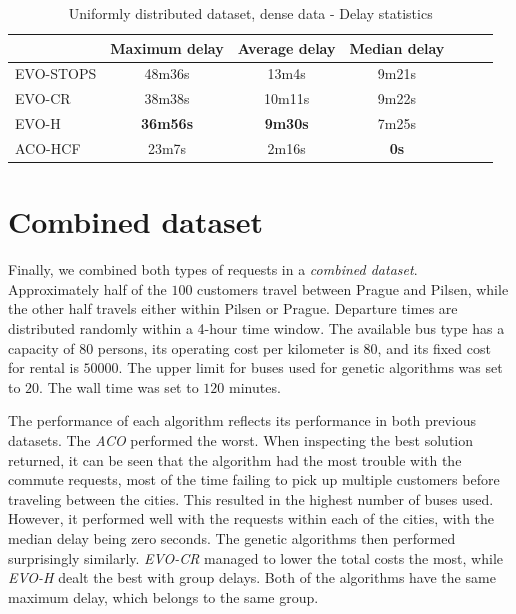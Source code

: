\begin{table}
    \centering
    \begin{tabular}{lcccccc}
         &  Maximum delay & Average delay & Median delay \\
         \hline
         EVO-STOPS & 48m36s & 13m4s & 9m21s \\
         EVO-CR & 38m38s & 10m11s & 9m22s \\
         EVO-H & \textbf{36m56s} & \textbf{9m30s} & 7m25s \\
         ACO-HCF & 23m7s & 2m16s & \textbf{0s} \\
    \end{tabular}
    \caption{Uniformly distributed dataset, dense data - Delay statistics}
    \label{tab:exp_random_dense_delay_stats}
\end{table}

\clearpage

\section{Combined dataset}

Finally, we combined both types of requests in a \textit{combined dataset}. Approximately half of the
$100$ customers travel between Prague and Pilsen, while the other half travels either within Pilsen or Prague. Departure times are distributed randomly within a 4-hour time window. The available bus type has a capacity of $80$ persons, its operating cost per kilometer is $80$, and its fixed cost for rental is $50000$. The upper limit for buses used for genetic algorithms was set to $20$. The wall time was set to $120$ minutes.

The performance of each algorithm reflects its performance in both previous datasets. The \textit{ACO} performed the worst. When inspecting the best solution returned, it can be seen that the algorithm had the most trouble with the commute requests, most of the time failing to pick up multiple customers before traveling between the cities. This resulted in the highest number of buses used. However, it performed well with the requests within each of the cities, with the median delay being zero seconds. The genetic algorithms then performed surprisingly similarly. \textit{EVO-CR}
managed to lower the total costs the most, while \textit{EVO-H} dealt the best with group delays. Both of the algorithms have the same maximum delay, which belongs to the same group.

\clearpage

